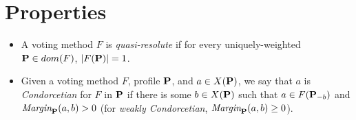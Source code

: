 \section{Properties}

\begin{definition}
    \begin{itemize}
        \item A voting method $F$ is \emph{quasi-resolute} if for every uniquely-weighted $\mathbf{P} \in dom(F)$, $|F (\mathbf{P})| = 1$.
        \item Given a voting method $F$, profile $\mathbf{P}$, and $a \in X(\mathbf{P})$, we say that $a$ is \emph{Condorcetian} for $F$ in $\mathbf{P}$ if there is some $b \in X(\mathbf{P})$ such that $a \in F(\mathbf{P}_{-b})$ and $\textit{Margin}_{\mathbf{P}}(a, b) > 0$ (for \emph{weakly Condorcetian}, $\textit{Margin}_{\mathbf{P}}(a, b) \geq 0$).
    \end{itemize}
\end{definition}

